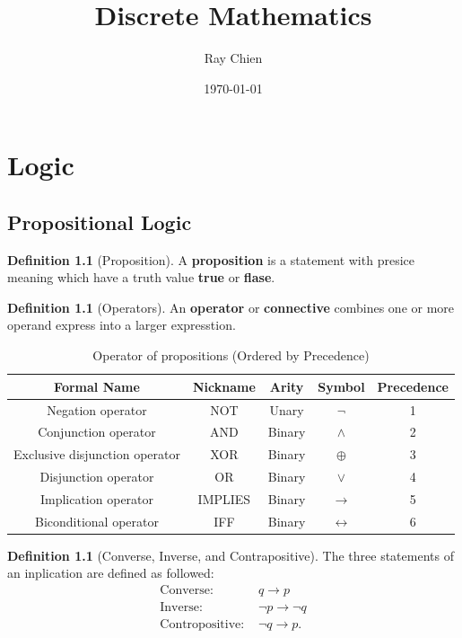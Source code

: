 \documentclass[12pt,a4paper]{report}
\title{Discrete Mathematics}
\author{Ray Chien}
\date{\today}
\theoremstyle{definition}
\newtheorem{definition}[theorem]{Definition}
\theoremstyle{remark}
\begin{document}
\maketitle
\tableofcontents

\chapter{Logic}

\section{Propositional Logic}

\begin{definition}[Proposition]
    A \textbf{proposition} is a statement with presice meaning which have a truth value \textbf{true} or \textbf{flase}. 
\end{definition}

\begin{definition}[Operators]
    An \textbf{operator} or \textbf{connective} combines one or more operand express into a larger expresstion.
\begin{table}[h]
    \centering
    \caption{Operator of propositions (Ordered by Precedence)}
    \begin{tabular}{c|c|c|c|c}
        Formal Name & Nickname & Arity & Symbol & Precedence\\
        \hline
        Negation operator & NOT & Unary & $\neg$ & 1\\
        \hline
        Conjunction operator & AND & Binary & $\land$ & 2 \\
        \hline
        Exclusive disjunction operator & XOR & Binary & $\oplus$ & 3 \\
        \hline
        Disjunction operator & OR & Binary & $\lor$ & 4 \\
        \hline
        Implication operator & IMPLIES & Binary & $\rightarrow$ & 5 \\
        \hline
        Biconditional operator & IFF & Binary & $\leftrightarrow$ & 6
    \end{tabular}
\end{table}
\end{definition}



\begin{definition}[Converse, Inverse, and Contrapositive]
    The three statements of an inplication are defined as followed:
    \begin{align*}
        \text{Converse: }& q \rightarrow p\\
        \text{Inverse: }& \neg p \rightarrow \neg q\\
        \text{Contropositive: }& \neg q \rightarrow p. 
    \end{align*}
\end{definition}
\end{document}
